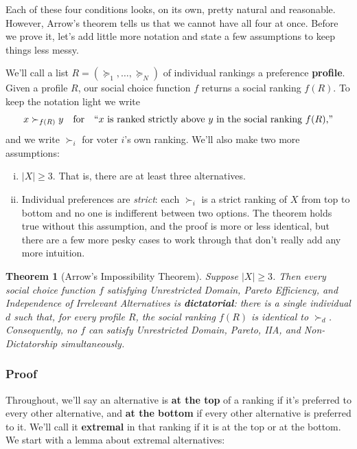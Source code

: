 \documentclass[12pt]{article}
\newtheorem{theorem}{Theorem}
\theoremstyle{definition}
\theoremstyle{remark}
\theoremstyle{plain}                          %
\begin{document}
\noindent
Each of these four conditions looks, on its own, pretty natural and reasonable. However, Arrow's theorem tells us that we cannot have all four at once. Before we prove it, let's add little more notation and state a few assumptions to keep things less messy.
 
We'll call a list $R = (\succeq_1,\dots,\succeq_N)$ of individual rankings a preference \textbf{profile}. Given a profile $R$, our social choice function $f$ returns a social ranking $f(R)$. To keep the notation light we write
\[
    x \succ_{f(R)} y \quad\text{for}\quad ``x \text{ is ranked strictly above } y \text{ in the social ranking } f(R)\text{,''}
\]
and we write $\succ_i$ for voter $i$'s own ranking. We'll also make two more assumptions:
\begin{enumerate}[(i), nosep, topsep=3pt]
    \item $|X| \ge 3$. That is, there are at least three alternatives.
    \item Individual preferences are \emph{strict}: each $\succ_i$ is a strict ranking of $X$ from top to bottom and no one is indifferent between two options. The theorem holds true without this assumption, and the proof is more or less identical, but there are a few more pesky cases to work through that don't really add any more intuition.
\end{enumerate}
 
\begin{theorem}[Arrow's Impossibility Theorem]
\label{thm:arrow}
Suppose $|X| \ge 3$. Then every social choice function $f$ satisfying Unrestricted Domain, Pareto Efficiency, and Independence of Irrelevant Alternatives is \textbf{dictatorial}: there is a single individual $d$ such that, for \emph{every} profile $R$, the social ranking $f(R)$ is identical to $\succ_d$. Consequently, no $f$ can satisfy Unrestricted Domain, Pareto, IIA, and Non-Dictatorship simultaneously.
\end{theorem}
 
\subsubsection{Proof}
 
Throughout, we'll say an alternative is \textbf{at the top} of a ranking if it's preferred to every other alternative, and \textbf{at the bottom} if every other alternative is preferred to it. We'll call it \textbf{extremal} in that ranking if it is at the top or at the bottom. We start with a lemma about extremal alternatives:
 
\end{document}
